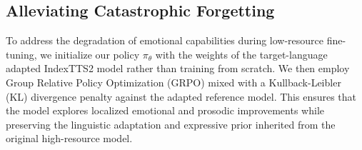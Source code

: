 \subsection{Alleviating Catastrophic Forgetting}
To address the degradation of emotional capabilities during low-resource fine-tuning, we initialize our policy $\pi_\theta$ with the weights of the target-language adapted IndexTTS2 model rather than training from scratch. We then employ Group Relative Policy Optimization (GRPO) mixed with a Kullback-Leibler (KL) divergence penalty against the adapted reference model. This ensures that the model explores localized emotional and prosodic improvements while preserving the linguistic adaptation and expressive prior inherited from the original high-resource model.

